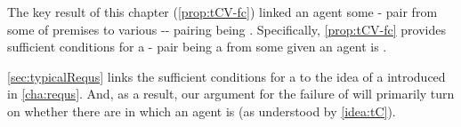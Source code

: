 \begin{note}
  The key result of this chapter (\autoref{prop:tCV-fc}) linked an agent \tCV{} some - pair from some \pool{} of premises to various -- pairing being .
  Specifically, \autoref{prop:tCV-fc} provides sufficient conditions for a - pair being a \fc{} from some \pool{} given an agent is \tCV{}.

  \autoref{sec:typicalRequs} links the sufficient conditions for a \fc{}  to the idea of a \requ{} introduced in \autoref{cha:requs}.
  And, as a result, our argument for the failure of \issueConstraint{} will primarily turn on whether there are  in which an agent is \tCV{} (as understood by \autoref{idea:tC}).
\end{note}







